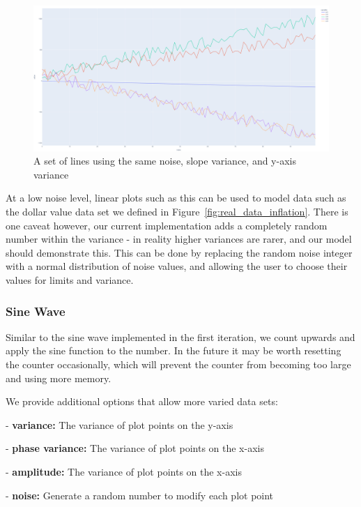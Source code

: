 \begin{figure}[H]
    \centering
    \includegraphics[width=12cm]{figures/data_generation/fake_data_linear_plot}
    \caption{A set of lines using the same noise, slope variance, and y-axis variance}
    \label{fig:datagen_fig_2}
\end{figure}

At a low noise level, linear plots such as this can be used to model data such as the dollar value data set we defined
in Figure~\ref{fig:real_data_inflation}.
There is one caveat however, our current implementation adds a completely random number within the variance - in reality
higher variances are rarer, and our model should demonstrate this.
This can be done by replacing the random noise integer with a normal distribution of noise values, and allowing the user
to choose their values for limits and variance.

\subsubsection{Sine Wave}

Similar to the sine wave implemented in the first iteration, we count upwards and apply the sine function to the number.
In the future it may be worth resetting the counter occasionally, which will prevent the counter from becoming too large
and using more memory.

We provide additional options that allow more varied data sets:

- \textbf{variance:} The variance of plot points on the y-axis

- \textbf{phase variance:} The variance of plot points on the x-axis

- \textbf{amplitude:} The variance of plot points on the x-axis

- \textbf{noise:} Generate a random number to modify each plot point


